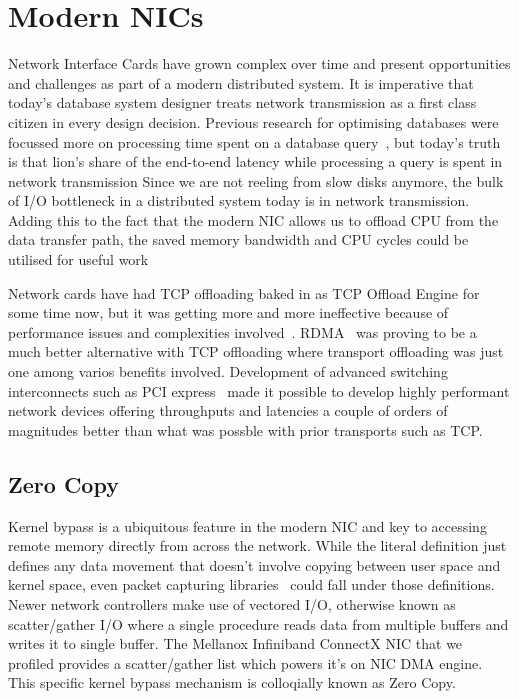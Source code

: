 
\chapter{Modern NICs}
Network Interface Cards have grown complex over time and present opportunities and 
challenges as part of a modern distributed system. It is imperative that today's
database system designer treats network transmission as a first class citizen in every design decision.
Previous research for optimising databases were focussed more on processing time spent on a 
database query~\cite{dbmsproctime}, but today's truth is that lion's share of the end-to-end latency
while processing a query is spent in network transmission
Since we are not reeling from slow disks anymore, the bulk of I/O bottleneck in a distributed system today is in network transmission.
Adding this to the fact that the modern NIC allows us to offload CPU from the data transfer path,
the saved memory bandwidth and CPU cycles could be utilised for useful work 

Network cards have had TCP offloading baked in as TCP Offload Engine for some time now, but it was getting 
more and more ineffective because of performance issues and complexities involved~\cite{tcpoffload}.
RDMA~\cite{rdma-patent,rdmacase,rdma} was proving to be a much better alternative with TCP offloading where
transport offloading was just one among varios benefits involved. Development of advanced switching 
interconnects such as PCI express~\cite{pcie} made it possible to develop highly performant 
network devices offering throughputs and latencies a couple of orders of magnitudes better
than what was possble with prior transports such as TCP.


\section{Zero Copy}
Kernel bypass is a ubiquitous feature in the modern NIC and key to accessing remote memory directly 
from across the network. While the literal definition just defines any data movement that doesn't 
involve copying between user space and kernel space, even packet capturing libraries~\cite{pcap} could fall
under those definitions. Newer network controllers make use of vectored I/O, otherwise known as scatter/gather I/O
where a single procedure reads data from multiple buffers and writes it to single buffer. The Mellanox Infiniband ConnectX
NIC that we profiled provides a scatter/gather list which powers it's on NIC DMA engine. This specific kernel bypass
mechanism is colloqially known as Zero Copy.

